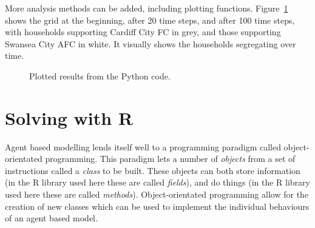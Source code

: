 More analysis methods can be added, including plotting functions.
Figure~\ref{fig:schelling_python_plot} shows the grid at the beginning, after 20
time steps, and after 100 time steps, with households supporting Cardiff City FC
in grey, and those supporting Swansea City AFC in white.
It visually shows the households segregating over time.

\begin{figure}
\begin{center}
\end{center}
\caption{Plotted results from the Python code.}
\label{fig:schelling_python_plot}
\end{figure}

\section{Solving with R}\label{sec:agent_based_simulation_solving-with-R}

Agent based modelling lends itself well to a programming paradigm called
object-orientated programming.
This paradigm lets a number of \textit{objects} from a set of instructions
called a \textit{class} to be built.
These objects can both store information (in the R library used here these are called
\textit{fields}), and do things (in the R library used here these are called
\textit{methods}).
Object-orientated programming allow for the creation of new classes which can be
used to implement the individual behaviours of an agent based model.

